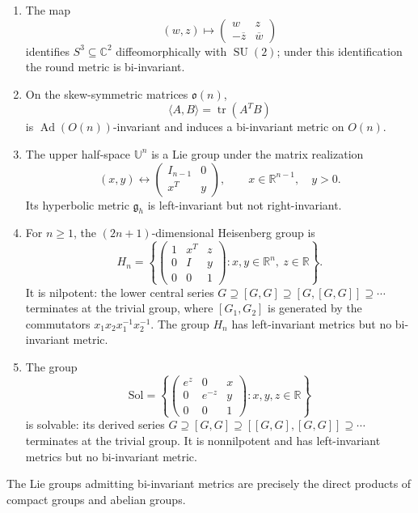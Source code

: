 \begin{example}
\begin{enumerate}[label=(\alph*)]
\item The map
\[
(w,z)\longmapsto
\begin{pmatrix}w&z\\-\overline z&\overline w\end{pmatrix} \tag{3.16}
\]
identifies $S^3\subseteq\mathbb C^2$ diffeomorphically with
$\operatorname{SU}(2)$; under this identification the round metric is
bi-invariant.

\item On the skew-symmetric matrices $\mathfrak o(n)$,
\[
\langle A,B\rangle=\operatorname{tr}(A^TB)
\]
is $\operatorname{Ad}(O(n))$-invariant and induces a bi-invariant metric on
$O(n)$.

\item The upper half-space $\mathbb U^n$ is a Lie group under the matrix
realization
\[
(x,y)\longleftrightarrow
\begin{pmatrix}I_{n-1}&0\\x^T&y\end{pmatrix},
\qquad x\in\mathbb R^{n-1},\quad y>0.
\]
Its hyperbolic metric $\mathfrak g_h$ is left-invariant but not right-invariant.

\item For $n\ge1$, the $(2n+1)$-dimensional Heisenberg group is
\[
H_n=\left\{
\begin{pmatrix}1&x^T&z\\0&I&y\\0&0&1\end{pmatrix}:
x,y\in\mathbb R^n,\ z\in\mathbb R
\right\}.
\]
It is nilpotent: the lower central series
$G\supseteq[G,G]\supseteq[G,[G,G]]\supseteq\cdots$ terminates at the trivial
group, where $[G_1,G_2]$ is generated by the commutators
$x_1x_2x_1^{-1}x_2^{-1}$. The group $H_n$ has left-invariant metrics but no
bi-invariant metric.

\item The group
\[
\mathrm{Sol}=\left\{
\begin{pmatrix}e^z&0&x\\0&e^{-z}&y\\0&0&1\end{pmatrix}:
x,y,z\in\mathbb R
\right\}
\]
is solvable: its derived series
$G\supseteq[G,G]\supseteq[[G,G],[G,G]]\supseteq\cdots$ terminates at the
trivial group. It is nonnilpotent and has left-invariant metrics but no
bi-invariant metric.
\end{enumerate}
\end{example}

The Lie groups admitting bi-invariant metrics are precisely the direct products
of compact groups and abelian groups.

